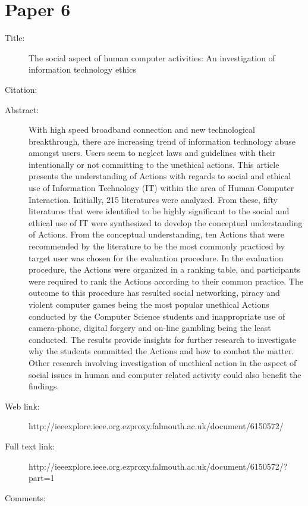 \documentclass{scrartcl}
\begin{document}
\section*{Paper 6}
\begin{description}
\item[Title:] The social aspect of human computer activities: An investigation of information technology ethics
\item[Citation:] \cite{ethics}
\item[Abstract:] With high speed broadband connection and new technological breakthrough, there are increasing trend of information technology abuse amongst users. Users seem to neglect laws and guidelines with their intentionally or not committing to the unethical actions. This article presents the understanding of Actions with regards to social and ethical use of Information Technology (IT) within the area of Human Computer Interaction. Initially, 215 literatures were analyzed. From these, fifty literatures that were identified to be highly significant to the social and ethical use of IT were synthesized to develop the conceptual understanding of Actions. From the conceptual understanding, ten Actions that were recommended by the literature to be the most commonly practiced by target user was chosen for the evaluation procedure. In the evaluation procedure, the Actions were organized in a ranking table, and participants were required to rank the Actions according to their common practice. The outcome to this procedure has resulted social networking, piracy and violent computer games being the most popular unethical Actions conducted by the Computer Science students and inappropriate use of camera-phone, digital forgery and on-line gambling being the least conducted. The results provide insights for further research to investigate why the students committed the Actions and how to combat the matter. Other research involving investigation of unethical action in the aspect of social issues in human and computer related activity could also benefit the findings.
\item[Web link:] http://ieeexplore.ieee.org.ezproxy.falmouth.ac.uk/document/6150572/
\item[Full text link:] http://ieeexplore.ieee.org.ezproxy.falmouth.ac.uk/document/6150572/?part=1
\item[Comments:] 
\end{description}
\end{document}
